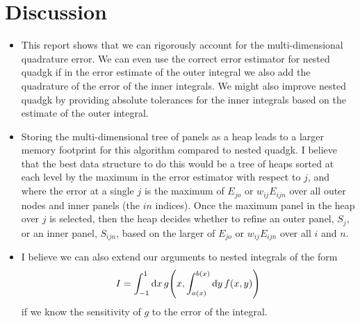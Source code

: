 \documentclass{article}
\begin{document}
\section{Discussion}

\begin{itemize}

\item    This report shows that we can rigorously account for the multi-dimensional
quadrature error. We can even use the correct error estimator for nested quadgk
if in the error estimate of the outer integral we also add the quadrature of the
error of the inner integrals. We might also improve nested quadgk by providing
absolute tolerances for the inner integrals based on the estimate of the outer
integral.

\item    Storing the multi-dimensional tree of panels as a heap leads to a
larger memory footprint for this algorithm compared to nested quadgk. I believe
that the best data structure to do this would be a tree of heaps sorted at each
level by the maximum in the error estimator with respect to $j$, and where the
error at a single $j$ is the maximum of $E_{jo}$ or $w_{ij}E_{ijn}$ over all
outer nodes and inner panels (the $in$ indices). Once the maximum panel in the
heap over $j$ is selected, then the heap decides whether to refine an outer
panel, $S_j$, or an inner panel, $S_{ijn}$, based on the larger of $E_{jo}$ or
$w_{ij}E_{ijn}$ over all $i$ and $n$.

\item    I believe we can also extend our arguments to nested integrals of the form
\begin{align}
    I = \int_{-1}^{1} \dd{x} g\qty(x, \int_{a(x)}^{b(x)} \dd{y} f(x,y))
\end{align}
if we know the sensitivity of $g$ to the error of the integral.
\end{itemize}
\end{document}

